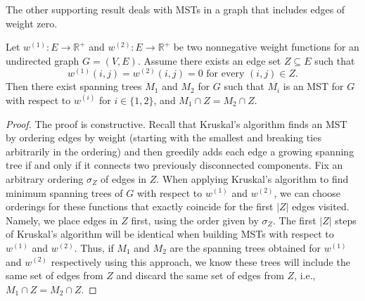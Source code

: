 The other supporting result deals with MSTs in a graph that includes edges of weight zero.
\begin{observation}
	\label{obs:Z}
	Let $w^{(1)} \colon E \rightarrow \mathbb{R}^+$ and $w^{(2)} \colon E \rightarrow \mathbb{R}^+$ be two nonnegative weight functions for an undirected graph $G = (V,E)$. Assume there exists an edge set $Z \subseteq E$ such that 
	\begin{equation*}
		w^{(1)}(i,j) = w^{(2)}(i,j) = 0 \text{ for every $(i,j) \in Z$}.
	\end{equation*}
	Then there exist spanning trees $M_1$ and $M_2$ for $G$ such that $M_i$ is an MST for $G$ with respect to $w^{(i)}$ for $i \in \{1,2\}$, and $M_1 \cap Z = M_2 \cap Z$.
\end{observation}
\begin{proof}
	The proof is constructive. Recall that Kruskal's algorithm finds an MST by ordering edges by weight (starting with the smallest and breaking ties arbitrarily in the ordering) and then greedily adds each edge a growing spanning tree if and only if it connects two previously disconnected components. 
	Fix an arbitrary ordering $\sigma_Z$ of edges in $Z$. When applying Kruskal's algorithm to find minimum spanning trees of $G$ with respect to $w^{(1)}$ and $w^{(2)}$, we can choose orderings for these functions that exactly coincide for the first $|Z|$ edges visited. Namely, we place edges in $Z$ first, using the order given by $\sigma_Z$. 
	The first $|Z|$ steps of Kruskal's algorithm will be identical when building MSTs with respect to $w^{(1)}$ and $w^{(2)}$. Thus, if $M_1$ and $M_2$ are the spanning trees obtained for $w^{(1)}$ and $w^{(2)}$ respectively using this approach, we know these trees will include the same set of edges from $Z$ and discard the same set of edges from $Z$, i.e., $M_1\cap Z = M_2 \cap Z.$
\end{proof}


